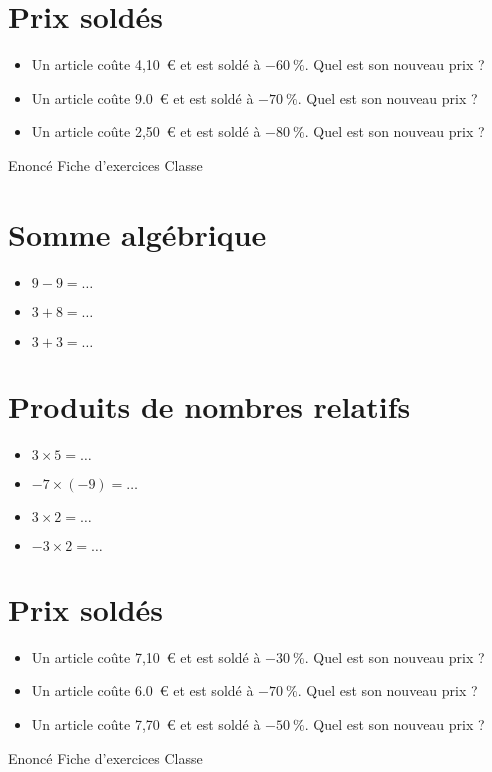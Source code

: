 \documentclass[a4paper,11pt,fleqn]{article}
\begin{document}
\section{Prix soldés}
\begin{itemize}

  \item Un article coûte 4,10~€ et est soldé à $-60~\%$. Quel est son nouveau prix ?
  \item Un article coûte 9.0~€ et est soldé à $-70~\%$. Quel est son nouveau prix ?
  \item Un article coûte 2,50~€ et est soldé à $-80~\%$. Quel est son nouveau prix ?
\end{itemize}
\newpage
\setcounter{exo}{0}
\setcounter{section}{0}
{Enoncé} \hfill {\huge Fiche d'exercices } \hfill {Classe}

\section{Somme algébrique}
\begin{itemize}

  \item $9 -9=\ldots$
  \item $3 +8=\ldots$
  \item $3 +3=\ldots$
\end{itemize}


\section{Produits de nombres relatifs}
\begin{itemize}

  \item $3\times5=\ldots$
  \item $-7\times(-9)=\ldots$
  \item $3\times2=\ldots$
  \item $-3\times2=\ldots$
\end{itemize}


\section{Prix soldés}
\begin{itemize}

  \item Un article coûte 7,10~€ et est soldé à $-30~\%$. Quel est son nouveau prix ?
  \item Un article coûte 6.0~€ et est soldé à $-70~\%$. Quel est son nouveau prix ?
  \item Un article coûte 7,70~€ et est soldé à $-50~\%$. Quel est son nouveau prix ?
\end{itemize}
\newpage
\setcounter{exo}{0}
\setcounter{section}{0}
{Enoncé} \hfill {\huge Fiche d'exercices } \hfill {Classe}
\end{document}
